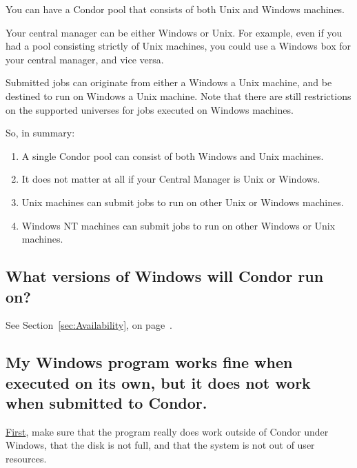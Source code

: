 You can have a Condor pool that consists of both Unix and Windows machines.

Your central manager can be either Windows or Unix.  For example,
even if you had a pool consisting strictly of Unix machines, you could
use a Windows box for your central manager, and vice versa.

Submitted jobs can originate from either a 
Windows  a Unix machine,
and be destined to run on Windows
 a Unix machine.
Note that there are still restrictions on the supported universes
for jobs executed on Windows machines.

So, in summary:

\begin{enumerate}

\item{A single Condor pool can consist of both Windows and Unix
machines.}

\item{It does not matter at all if your Central Manager is Unix or Windows.}

\item{Unix machines can submit jobs to run on other Unix or Windows
machines.}

\item{Windows NT machines can submit jobs to run on other Windows
or Unix machines.}

\end{enumerate}


\subsection*{What versions of Windows will Condor run on?}

See Section~\ref{sec:Availability}, on
page~\pageref{sec:Availability}.


\subsection*{My Windows program works fine when executed on its own, but it
does not work when submitted to Condor.}

\underline{First}, make sure that the program really does work
outside of Condor under Windows,
that the disk is not full,
and that the system is not out of user resources.

